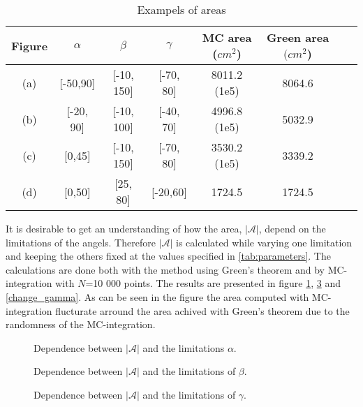 \begin{table} \label{resultExampleTable}
\begin{center}
\begin{tabular}{|c|c|c|c|c|c|c|c|}
\hline
\bf Figure & $\alpha$ & \bf $\beta$ & \bf $\gamma$ & \bf MC area ($cm^2$)& \bf Green area $(cm^2$) \\\hline
(a) & [-50,90]  & [-10, 150] & [-70, 80] & 8011.2 (1e5) & 8064.6 \\\hline
(b)& [-20, 90] & [-10, 100]  & [-40, 70] & 4996.8 (1e5) & 5032.9\\\hline
(c) &[0,45] & [-10, 150] & [-70, 80] & 3530.2 (1e5) & 3339.2\\\hline
(d) & [0,50] & [25, 80] & [-20,60] & 1724.5 & 1724.5\\\hline
\end{tabular}
\caption{Exampels of areas}
\label{tab:ex}
\end{center}
\end{table}


It is desirable to get an understanding  of how the area, $|\mathcal{A}|$, depend on the limitations of the angels. Therefore $|\mathcal{A}|$ is calculated while varying one  limitation and keeping the others fixed at the values specified in \ref{tab:parameters}. The calculations are done both with the method using Green's theorem and by MC-integration with $N$=10 000 points. The results are presented in figure \ref{change_alpha}, \ref{change_beta} and \ref{change_gamma}. As can be seen in the figure the area computed with MC-integration flucturate arround  the area achived with Green's theorem due to the randomness of the MC-integration.

\begin{figure}[!ht]
  \centering
 \caption{Dependence between $|\mathcal{A}|$ and the limitations $\alpha$. \label{change_alpha}}
\end{figure}
\begin{figure}[!ht]
  \caption{Dependence between $|\mathcal{A}|$ and the limitations of $\beta$. \label{change_beta}}
\end{figure}
\begin{figure}[!ht]
  \caption{Dependence between $|\mathcal{A}|$ and the limitations of $\gamma$. \label{change_beta}}
\end{figure}


